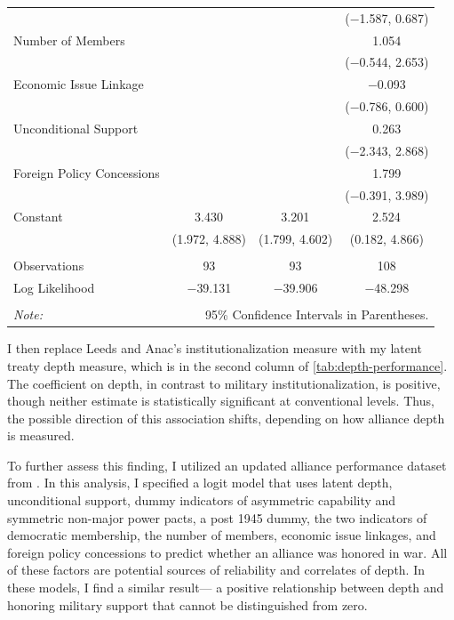 \documentclass[12pt]{article}
\begin{document}
\begin{table}[!htbp]
\begin{adjustbox}{width= .95\textwidth, center}
\begin{tabular}{@{\extracolsep{5pt}}lccc}
  &  &  & ($-$1.587, 0.687) \\ 
  Number of Members &  &  & 1.054 \\ 
  &  &  & ($-$0.544, 2.653) \\ 
  Economic Issue Linkage &  &  & $-$0.093 \\ 
  &  &  & ($-$0.786, 0.600) \\ 
  Unconditional Support &  &  & 0.263 \\ 
  &  &  & ($-$2.343, 2.868) \\ 
  Foreign Policy Concessions &  &  & 1.799 \\ 
  &  &  & ($-$0.391, 3.989) \\ 
  Constant & 3.430$^{}$ & 3.201$^{}$ & 2.524$^{}$ \\ 
  & (1.972, 4.888) & (1.799, 4.602) & (0.182, 4.866) \\ 
 \hline \\[-1.8ex] 
Observations & 93 & 93 & 108 \\ 
Log Likelihood & $-$39.131 & $-$39.906 & $-$48.298 \\ 
\hline 
\hline \\[-1.8ex] 
\textit{Note:}  & \multicolumn{3}{r}{95\% Confidence Intervals in Parentheses.} \\ 
\end{tabular}
\end{adjustbox} 
\end{table}


I then replace Leeds and Anac's institutionalization measure with my latent treaty depth measure, which is in the second column of \autoref{tab:depth-performance}. 
The coefficient on depth, in contrast to military institutionalization, is positive, though neither estimate is statistically significant at conventional levels. 
Thus, the possible direction of this association shifts, depending on how alliance depth is measured.


To further assess this finding, I utilized an updated alliance performance dataset from \citet{BerkemeierFuhrmann2018}.
In this analysis, I specified a logit model that uses latent depth, unconditional support, dummy indicators of asymmetric capability and symmetric non-major power pacts, a post 1945 dummy, the two indicators of democratic membership, the number of members, economic issue linkages, and foreign policy concessions to predict whether an alliance was honored in war. 
All of these factors are potential sources of reliability and correlates of depth. 
In these models, I find a similar result--- a positive relationship between depth and honoring military support that cannot be distinguished from zero.
\end{document}
